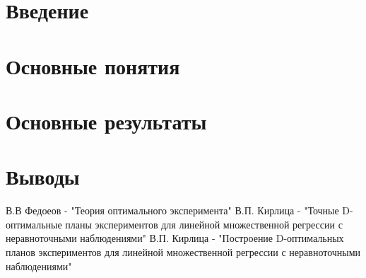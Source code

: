 \documentclass[12pt,a4paper]{article}
\begin{document}


\tableofcontents
\pagebreak

\section{Введение}
	
\pagebreak

\section {Основные понятия}
	
\pagebreak
	
\section{Основные результаты}
	
	
\pagebreak
	
\section{Выводы}
	
\pagebreak
	
\begin{thebibliography}{}
	 В.В Федоеов - "Теория оптимального эксперимента"
	 В.П. Кирлица - "Точные  D-оптимальные планы экспериментов для линейной множественной регрессии с неравноточными наблюдениями"
	 В.П. Кирлица - "Построение  D-оптимальных  планов экспериментов для линейной множественной регрессии с неравноточными наблюдениями"
\end{thebibliography}
\end{document}
